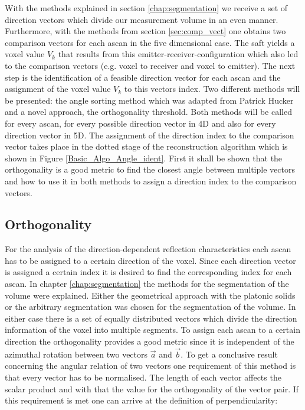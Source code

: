 With the methods explained in section \ref{chap:segmentation} we receive a set of direction vectors which divide our measurement volume in an even manner. 
Furthermore, with the methods from section \ref{sec:comp_vect} one obtains two comparison vectors for each \ac{ascan} in the five dimensional case. The \ac{saft} yields a voxel value $V_k$ that results from this emitter-receiver-configuration which also led to the comparison vectors (e.g. voxel to receiver and voxel to emitter). The next step is the identification of a feasible direction vector for each \ac{ascan} and the assignment of the voxel value $V_k$ to this vectors index. Two different methods will be presented: the angle sorting method which was adapted from Patrick Hucker \cite{PatrickHucker2014EvaluationRuckstreumodells} and a novel approach, the orthogonality threshold. Both methods will be called for every \ac{ascan}, for every possible direction vector in 4D and also for every direction vector in 5D. The assignment of the direction index to the comparison vector takes place in the dotted stage of the reconstruction algorithm which is shown in Figure \ref{Basic_Algo_Angle_ident}. First it shall be shown that the orthogonality is a good metric to find the closest angle between multiple vectors and how to use it in both methods to assign a direction index to the comparison vectors. 

\subsection{Orthogonality}
\label{sec:orthogonality}

For the analysis of the direction-dependent reflection characteristics each \ac{ascan} has to be assigned to a certain direction of the voxel. Since each direction vector is assigned a certain index it is desired to find the corresponding index for each \ac{ascan}. 
In chapter \ref{chap:segmentation} the methods for the segmentation of the volume were explained. Either the geometrical approach with the platonic solids or the arbitrary segmentation was chosen for the segmentation of the volume. In either case there is a set of equally distributed vectors which divide the direction information of the voxel into multiple segments. To assign each \ac{ascan} to a certain direction the orthogonality provides a good metric since it is independent of the azimuthal rotation between two vectors $\overrightarrow{a}$ and $ \overrightarrow{b}$. 
To get a conclusive result concerning the angular relation of two vectors one requirement of this method is that every vector has to be normalised. The length of each vector affects the scalar product and with that the value for the orthogonality of the vector pair.
If this requirement is met one can arrive at the definition of perpendicularity:

